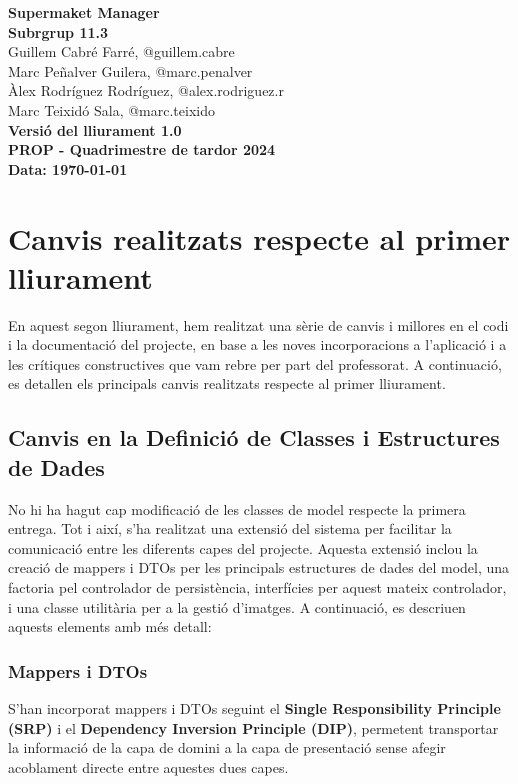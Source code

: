 \documentclass[a4paper,12pt]{report}
\newcommand{\titolPractica}{Supermaket Manager}
\newcommand{\identificadorEquip}{Subrgrup 11.3}
\newcommand{\PROPquatrimestre}{PROP - Quadrimestre de tardor 2024}
\newcommand{\versioLliurament}{Versió del lliurament 1.0}
\begin{document}
\begin{titlepage}
	\begin{center}
		{\Large \textbf{\titolPractica}} \\[10cm]
		\textbf{\large \identificadorEquip} \\[1cm]
		Guillem Cabré Farré, \small{@guillem.cabre} \\
		Marc Peñalver Guilera, \small{@marc.penalver} \\
		Àlex Rodríguez Rodríguez, \small{@alex.rodriguez.r} \\
		Marc Teixidó Sala, \small{@marc.teixido} \\[2cm]
		\textbf{\versioLliurament} \\
		\textbf{\PROPquatrimestre} \\
		\textbf{Data: \today}
	\end{center}
\end{titlepage}

\tableofcontents
\clearpage

\chapter{Canvis realitzats respecte al primer lliurament}

En aquest segon lliurament, hem realitzat una sèrie de canvis i millores en el codi i la documentació del projecte, en base a les noves incorporacions a l'aplicació i a les crítiques constructives que vam rebre per part del professorat. A continuació, es detallen els principals canvis realitzats respecte al primer lliurament.

\section{Canvis en la Definició de Classes i Estructures de Dades}

No hi ha hagut cap modificació de les classes de model respecte la primera entrega. Tot i així, s'ha realitzat una extensió del sistema per facilitar la comunicació entre les diferents capes del projecte. Aquesta extensió inclou la creació de mappers i DTOs per les principals estructures de dades del model, una factoria pel controlador de persistència, interfícies per aquest mateix controlador, i una classe utilitària per a la gestió d'imatges. A continuació, es descriuen aquests elements amb més detall:

\subsection{Mappers i DTOs}
S'han incorporat mappers i DTOs seguint el \textbf{Single Responsibility Principle (SRP)} i el \textbf{Dependency Inversion Principle (DIP)}, permetent transportar la informació de la capa de domini a la capa de presentació sense afegir acoblament directe entre aquestes dues capes.\\
\end{document}
